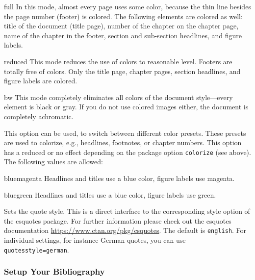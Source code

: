 \documentclass{ltxdockit}
\begin{document}
\begin{optionlist}
\begin{valuelist}
\item[full] In this mode, almost every page uses some color, because the thin line besides the page number (footer) is colored.
	The following elements are colored as well: title of the document (title page), number of the chapter on the chapter page, name of the chapter in the footer, section and sub-section headlines, and figure labels.
\item[reduced] This mode reduces the use of colors to reasonable level.
	Footers are totally free of colors.
	Only the title page, chapter pages, section headlines, and figure labels are colored.
\item[bw] This mode completely eliminates all colors of the document style---every element is black or gray.
	If you do not use colored images either, the document is completely achromatic.
\end{valuelist}


This option can be used, to switch between different color presets.
These presets are used to colorize, e.g., headlines, footnotes, or chapter numbers.
This option has a reduced or no effect depending on the package option \texttt{colorize} (see above).
The following values are allowed:

\begin{valuelist}
\item[bluemagenta] Headlines and titles use a blue color, figure labels use magenta.
\item[bluegreen] Headlines and titles use a blue color, figure labels use green.
\end{valuelist}


Sets the quote style.
This is a direct interface to the corresponding style option of the csquotes package.
For further information please check out the csquotes documentation \url{https://www.ctan.org/pkg/csquotes}.
The default is \texttt{english}.
For individual settings, for instance German quotes, you can use \texttt{quotesstyle=german}.


\subsubsection{Setup Your Bibliography}



\end{optionlist}
\end{document}
